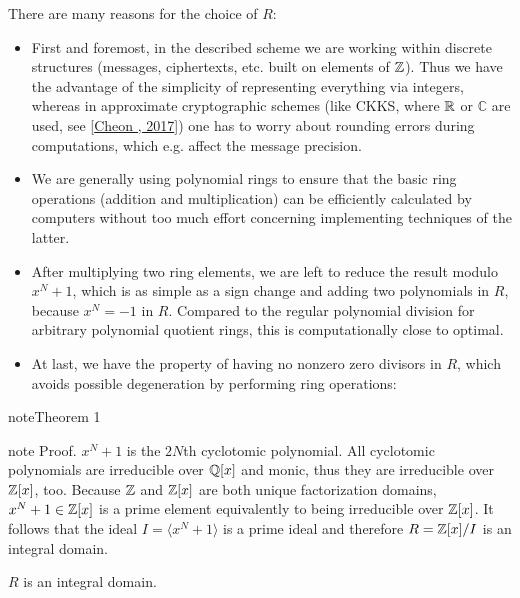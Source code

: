 \documentclass[letterpaper,10pt,english]{jupyterBook}
\begin{document}
\sphinxAtStartPar
There are many reasons for the choice of \(R\):
\begin{itemize}
\item {} 
\sphinxAtStartPar
First and foremost, in the described scheme we are working within discrete structures (messages, ciphertexts, etc. built on elements of \(\mathbb Z\)).
Thus we have the advantage of the simplicity of representing everything via integers, whereas in approximate cryptographic schemes (like CKKS, where \(\mathbb R\) or \(\mathbb C\) are used, see {[}\hyperlink{cite.Thesis:id69}{Cheon , 2017}{]}) one has to worry about rounding errors during computations, which e.g. affect the message precision.

\item {} 
\sphinxAtStartPar
We are generally using polynomial rings to ensure that the basic ring operations (addition and multiplication) can be efficiently calculated by computers without too much effort concerning implementing techniques of the latter.

\item {} 
\sphinxAtStartPar
After multiplying two ring elements, we are left to reduce the result modulo \(x^N + 1\), which is as simple as a sign change and adding two polynomials in \(R\), because \(x^N = -1\) in \(R\).
Compared to the regular polynomial division for arbitrary polynomial quotient rings, this is computationally close to optimal.

\item {} 
\sphinxAtStartPar
At last, we have the property of having no nonzero zero divisors in \(R\), which avoids possible degeneration by performing ring operations:

\end{itemize}
\label{Thesis:R_integral}
\begin{sphinxadmonition}{note}{Theorem 1}
\end{sphinxadmonition}

\begin{sphinxadmonition}{note}
\sphinxAtStartPar
Proof. \(x^N+1\) is the \(2N\)\sphinxhyphen{}th cyclotomic polynomial.
All cyclotomic polynomials are irreducible over \(\mathbb Q[x]\) and monic, thus they are irreducible over \(\mathbb Z[x]\), too.
Because \(\mathbb Z\) and \(\mathbb Z[x]\) are both unique factorization domains, \(x^N+1 \in \mathbb Z[x]\) is a prime element equivalently to being irreducible over \(\mathbb Z[x]\).
It follows that the ideal \(I = \langle x^N +1 \rangle\) is a prime ideal and therefore \(R = \mathbb Z[x]/I\) is an integral domain.
\end{sphinxadmonition}
\label{\detokenize{Thesis:the-modular-variant-of-the-ring-r}}
\sphinxAtStartPar
\(R\) is an integral domain.
\end{document}
